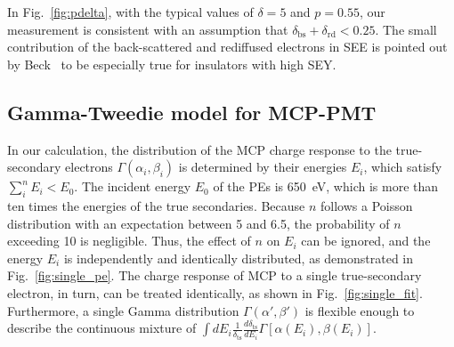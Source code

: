 In Fig.~\ref{fig:pdelta}, with the typical values of \(\delta=5\) and \(p=0.55\),
our measurement is consistent with an assumption that \(\delta_\text{bs} + \delta_\text{rd} < 0.25\).
The small contribution of the back-scattered and rediffused electrons in SEE is pointed out by Beck~\cite{beck_physical_1966} to be especially true for insulators with high SEY.




\subsection{Gamma-Tweedie model for MCP-PMT}\label{sec:model}
In our calculation, the distribution of the MCP charge response to the true-secondary electrons $\varGamma(\alpha_{i},\beta_{i})$ is determined by their energies $E_{i}$,
which satisfy $\sum_{i}^{n}E_{i}<E_0$.
The incident energy \(E_0\) of the PEs is \SI{650}{eV},
which is more than ten times the energies of the true secondaries.
Because $n$ follows a Poisson distribution with an expectation between 5 and 6.5,
the probability of $n$ exceeding 10 is negligible.
Thus, the effect of $n$ on $E_{i}$ can be ignored,
and the energy \(E_{i}\) is independently and identically distributed, as demonstrated in Fig.~\ref{fig:single_pe}.
The charge response of MCP to a single true-secondary electron, in turn, can be treated identically, as shown in Fig.~\ref{fig:single_fit}.
Furthermore, a single Gamma distribution \(\varGamma(\alpha',\beta')\)
is flexible enough to describe the continuous mixture of
\(\int dE_{i}\frac{1}{\delta_{\mathrm{ts}}}\frac{d\delta_{\mathrm{ts}}}{dE_{i}}\varGamma[\alpha(E_{i}),\beta(E_{i})]\).

